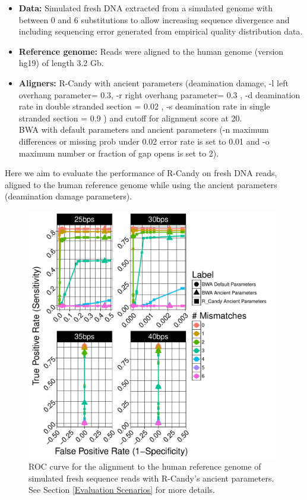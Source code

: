 \documentclass[11pt,a4paper]{report}
\begin{document}
\label{ Alignment of Simulated Fresh DNA Reads to a the Human Reference Genome.}


 \begin{itemize}
 
   \item \textbf{Data:} Simulated fresh DNA extracted from a simulated genome 
   with between 0 and 6 substitutions to allow increasing sequence divergence
   and including sequencing error generated from empirical quality distribution
   data.
   
   \item \textbf{Reference genome:} Reads were aligned to the human genome 
   (version hg19) of length 3.2 Gb.

    \item \textbf{Aligners:}
    R-Candy with ancient parameters 
  	(deamination damage, -l left overhang parameter= 0.3, -r right overhang parameter= 0.3 , 
	-d deamination rate in double stranded section = 0.02 , 
	-s deamination rate in single stranded section = 0.9 )
  	and cutoff for alignment score at 20. \\
  	BWA with default parameters and ancient parameters \cite{green2010draft}
	(-n maximum differences or missing prob under 0.02 error rate is set to 0.01 
     and -o maximum number or fraction of gap opens is set to 2)\cite{green2010draft}.
   
 \end{itemize}
	
	
Here we aim to evaluate the performance of R-Candy on fresh DNA reads, 
aligned to the human reference genome while using the ancient parameters
(deamination damage parameters).


\begin{figure}[H]
\centering
\includegraphics[width=11cm]{pictures/f_DS9_22_20_54_emp.pdf}
\caption{ 
ROC curve for the alignment to the human reference genome of simulated 
fresh sequence reads with R-Candy's ancient parameters. See Section 
\ref{Evaluation 
Scenarios} for more details.
}
\label{DS9_emp}
\end{figure}
 
\end{document}
